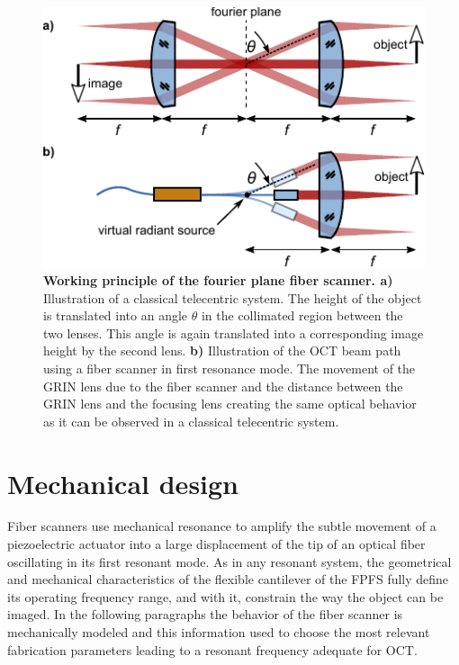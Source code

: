 \documentclass[10pt]{iopart}
\begin{document}
\begin{figure}[h]\centering \includegraphics[width=\columnwidth]{figures/fps2.pdf}
      \caption{\textbf{Working principle of the fourier plane fiber scanner.
      a)} Illustration of a classical telecentric system. The height of the object is translated into an angle $\theta$ in the collimated region between the two lenses. This angle is again translated into a corresponding image height by the second lens.
      \textbf{b)} Illustration of the OCT beam path using a fiber scanner in first resonance mode. The movement of the GRIN lens due to the fiber scanner and the distance between the GRIN lens and the focusing lens creating the same optical behavior as it can be observed in a classical telecentric system.}
      \label{fig:fps}
\end{figure}



\section{Mechanical design}
Fiber scanners use mechanical resonance to amplify the subtle movement of a piezoelectric actuator into a large displacement of the tip of an optical fiber oscillating in its first resonant mode. As in any resonant system, the geometrical and mechanical characteristics of the flexible cantilever of the FPFS fully define its operating frequency range, and with it, constrain the way the object can be imaged. In the following paragraphs the behavior of the fiber scanner is mechanically modeled and this information used to choose the most relevant fabrication parameters leading to a resonant frequency adequate for OCT.
\end{document}

